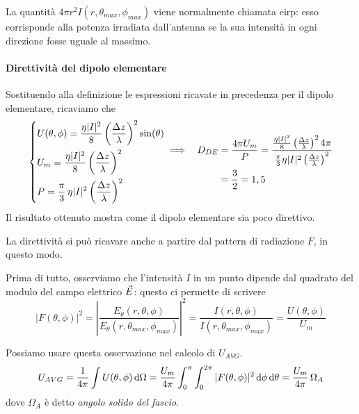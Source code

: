 La quantità $4\pi r^2 I(r,\theta_{max},\phi_{max})$ viene normalmente chiamata \gls{eirp}: esso corrisponde alla potenza irradiata dall'antenna se la sua intensità in ogni direzione fosse uguale al massimo.

\paragraph{Direttività del dipolo elementare}

Sostituendo alla definizione le espressioni ricavate in precedenza per il dipolo elementare, ricaviamo che
\begin{equation*}
	\begin{dcases}
		U(\theta,\phi) = \frac{\eta |I|^2}{8} \left(\frac{\Delta z}{\lambda}\right)^2 \sin(\theta) \\
		U_m = \frac{\eta |I|^2}{8} \left(\frac{\Delta z}{\lambda}\right)^2\\
		P = \frac{\pi}{3} \, \eta |I|^2 \left(\frac{\Delta z}{\lambda}\right)^2
	\end{dcases}
	\begin{split}
		\implies ~~ D_{DE}
		& = \frac{4\pi U_m}{P}
		= \frac{\frac{\eta |I|^2}{8} \left(\frac{\Delta z}{\lambda}\right)^2 4\pi}{\frac{\pi}{3}\eta |I|^2 \left(\frac{\Delta z}{\lambda}\right)^2} \\
		& = \frac{3}{2} = 1,5
	\end{split}
\end{equation*}
Il risultato ottenuto mostra come il dipolo elementare sia poco direttivo.

\bigbreak
La direttività si può ricavare anche a partire dal pattern di radiazione $F$, in questo modo.

Prima di tutto, osserviamo che l'intensità $I$ in un punto dipende dal quadrato del modulo del campo elettrico $\vec{E}$: questo ci permette di scrivere
\begin{equation*}
	|F(\theta, \phi)|^2
	= \left|\frac{E_\theta(r, \theta, \phi)}{E_\theta(r, \theta_{max}, \phi_{max})} \right|^2
	= \frac{I(r, \theta, \phi)}{I(r, \theta_{max}, \phi_{max})}
	= \frac{U(\theta, \phi)}{U_m}
\end{equation*}

Possiamo usare questa osservazione nel calcolo di $U_{AVG}$.
\begin{equation*}
	U_{AVG}
	= \frac{1}{4\pi} \int U(\theta, \phi) \mathop{}\!\mathrm{d} \Omega
	= \frac{U_m}{4\pi} \int_0^\pi \int_0^{2\pi} |F(\theta, \phi)|^2  \mathop{}\!\mathrm{d} \phi \mathop{}\!\mathrm{d} \theta
	= \frac{U_m}{4\pi} \, \Omega_A
\end{equation*}
dove $\Omega_A$ è detto \emph{angolo solido del fascio}.

